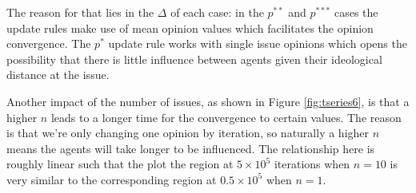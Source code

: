 \documentclass{article}
\begin{document}
    The reason for that lies in the \(\Delta\) of each case: in the \(p^{**}\)
    and \(p^{***}\) cases the update rules make use of mean opinion values which
    facilitates the opinion convergence. The \(p^{*}\) update rule works with
    single issue opinions which opens the possibility that there is little
    influence between agents given their ideological distance at the issue.
    
    Another impact of the number of issues, as shown in Figure
    \ref{fig:tseries6}, is that a higher \(n\) leads to a longer time for the
    convergence to certain values. The reason is that we're only changing one
    opinion by iteration, so naturally a higher \(n\) means the agents will take
    longer to be influenced. The relationship here is roughly linear such that
    the plot the region at \(5 \times 10^5\) iterations when \(n = 10\) is very
    similar to the corresponding region at \(0.5 \times 10^5\) when \(n = 1\).
    
\end{document}
